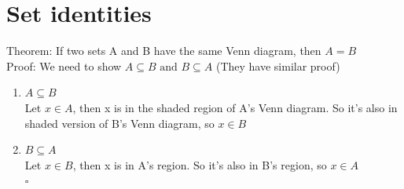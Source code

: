 \documentclass{article}
\begin{document}
\section{Set identities}
Theorem: If two sets A and B have the same Venn diagram, then $A=B$
\\ Proof: We need to show $A \subseteq B \text{ and } B \subseteq A $ (They have similar proof)
\begin{enumerate}
    \item $A \subseteq B$ \\ Let $x \in A$, then x is in the shaded region of A's Venn diagram. So it's also in shaded version of B's Venn diagram, so $x \in B$
    \item $B \subseteq A$ \\ Let $x \in B$, then x is in A's region. So it's also in B's region, so $x \in A$
          \\ \hspace*{\fill} $\square$

\end{enumerate}
\end{document}
